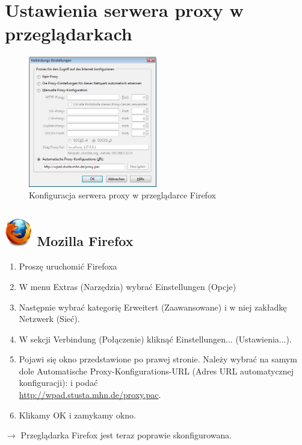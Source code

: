 \documentclass[a4paper,12pt]{scrartcl}
\begin{document}
\newpage

\section*{Ustawienia serwera proxy w przeglądarkach}

\begin{figure}
  \begin{center}
    \includegraphics[width=0.5\textwidth,keepaspectratio]{Bilder/Proxy_Firefox}
  \end{center}
  \caption{Konfiguracja serwera proxy w przeglądarce Firefox}
\end{figure}

\subsection*{\includegraphics[height=1.2cm,keepaspectratio]{Bilder/Firefox_35_logo} Mozilla Firefox}
\begin{enumerate}
    \item Proszę uruchomić Firefoxa
    \item W menu Extras (Narzędzia) wybrać Einstellungen (Opcje)
    \item Następnie wybrać kategorię Erweitert (Zaawansowane) i w niej zakładkę Netzwerk (Sieć).
    \item W sekcji Verbindung (Połączenie) kliknąć Einstellungen... (Ustawienia...).
    \item Pojawi się okno przedstawione po prawej stronie. Należy wybrać na samym dole Automatische Proxy-Konfigurations-URL (Adres URL automatycznej konfiguracji): i podać\\ \url{http://wpad.stusta.mhn.de/proxy.pac}.
    \item Klikamy OK i zamykamy okno.
\end{enumerate}
$\rightarrow$ Przeglądarka Firefox jest teraz poprawie skonfigurowana.
\end{document}
